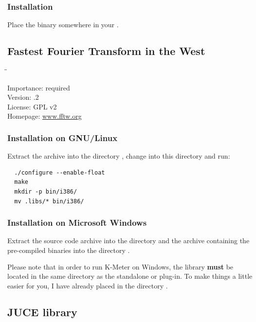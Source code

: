 \subsubsection{Installation}

Place the binary somewhere in your .

\subsection{Fastest Fourier Transform in the West}

\begin{tabbing}
  \hspace*{6em}\=\=\kill

  Importance:  \> required \\
  Version:     .2 \\
  License:     \> GPL v2 \\
  Homepage:    \> \href{http://www.fftw.org/}{www.fftw.org}
\end{tabbing}

\subsubsection{Installation on GNU/Linux}

Extract the archive into the directory , change
into this directory and run:

\begin{verbatim}
  ./configure --enable-float
  make
  mkdir -p bin/i386/
  mv .libs/* bin/i386/
\end{verbatim}

\subsubsection{Installation on Microsoft Windows}

Extract the source code archive into the directory
 and the archive containing the pre-compiled
binaries into the directory .

Please note that in order to run K-Meter on Windows, the library
 \textbf{must} be located in the same directory
as the standalone or plug-in.  To make things a little easier for you,
I have already placed  in the directory
.

\subsection{JUCE library}

